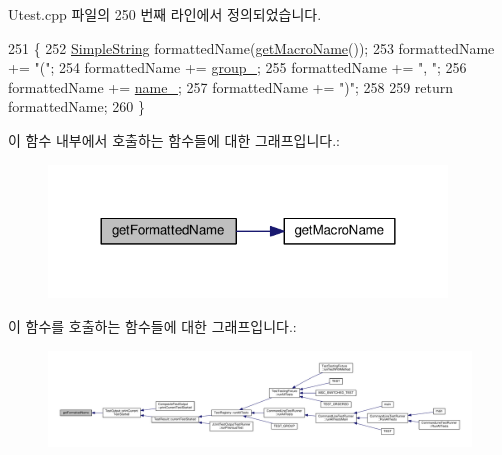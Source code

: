 Utest.\+cpp 파일의 250 번째 라인에서 정의되었습니다.


\begin{DoxyCode}
251 \{
252     \hyperlink{class_simple_string}{SimpleString} formattedName(\hyperlink{class_utest_shell_abc98797be12f56d8e67d44e2328f885f}{getMacroName}());
253     formattedName += \textcolor{stringliteral}{"("};
254     formattedName += \hyperlink{class_utest_shell_a23bf1d2194a41c994be9fb00f88746d8}{group\_};
255     formattedName += \textcolor{stringliteral}{", "};
256     formattedName += \hyperlink{class_utest_shell_a7dac8366c11fbcad2f49d85fe8fc4fbe}{name\_};
257     formattedName += \textcolor{stringliteral}{")"};
258 
259     \textcolor{keywordflow}{return} formattedName;
260 \}
\end{DoxyCode}


이 함수 내부에서 호출하는 함수들에 대한 그래프입니다.\+:
\nopagebreak
\begin{figure}[H]
\begin{center}
\leavevmode
\includegraphics[width=300pt]{class_utest_shell_af1b3219048ca8ae0e2bb935b813b4b92_cgraph}
\end{center}
\end{figure}




이 함수를 호출하는 함수들에 대한 그래프입니다.\+:
\nopagebreak
\begin{figure}[H]
\begin{center}
\leavevmode
\includegraphics[width=350pt]{class_utest_shell_af1b3219048ca8ae0e2bb935b813b4b92_icgraph}
\end{center}
\end{figure}


